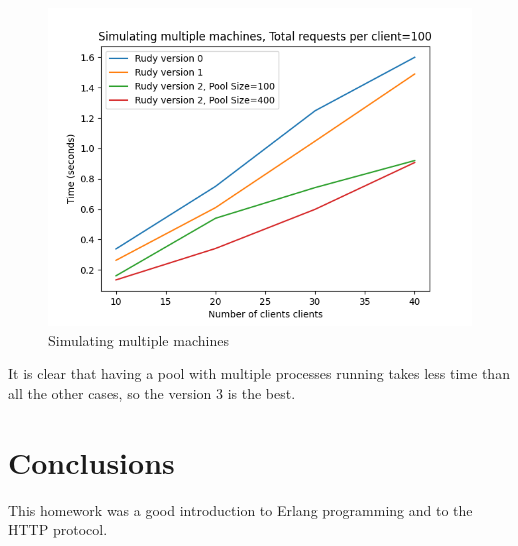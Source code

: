 \documentclass[a4paper, 11pt]{article}
\begin{document}
\begin{figure}
  \begin{center}
    \includegraphics[scale=0.4]{result2.png}
    \caption{Simulating multiple machines}
    \label{fig:results2}
  \end{center}
\end{figure}
It is clear that having a pool with multiple processes running takes less time than all the other cases, so the version 3 is the best.

\section{Conclusions}
This homework was a good introduction to Erlang programming and to the HTTP protocol.
\end{document}
